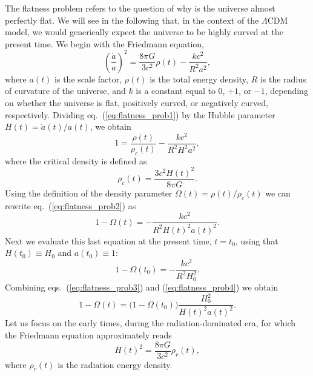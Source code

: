 \documentclass[11pt, a4paper,oneside,openright]{book}
\numberwithin{equation}{section}
\begin{document}
The flatness problem refers to the question of why is the universe almost perfectly flat. We will see in the following that, in the context of the $\Lambda$CDM model, we would generically expect the universe to be highly curved at the present time. We begin with the Friedmann equation,
\begin{equation} \label{eq:flatness_prob1}
\left(\frac{\dot{a}}{a}\right)^2=\frac{8\pi G}{3c^2}\rho(t)-\frac{kc^2}{R^2a^2},
\end{equation}
where $a(t)$ is the scale factor, $\rho(t)$ is the total energy density, $R$ is the radius of curvature of the universe, and $k$ is a constant equal to $0$, $+1$, or $-1$, depending on whether the universe is flat, positively curved, or negatively curved, respectively. Dividing eq.\ (\ref{eq:flatness_prob1}) by the Hubble parameter $H(t)=\dot{a}(t)/a(t)$, we obtain
\begin{equation} \label{eq:flatness_prob2}
1=\frac{\rho(t)}{\rho_c(t)}-\frac{kc^2}{R^2H^2a^2},
\end{equation}
where the critical density is defined as
\begin{equation}
\rho_c(t)=\frac{3c^2H(t)^2}{8\pi G}.
\end{equation}
Using the definition of the density parameter $\Omega(t)=\rho(t)/\rho_c(t)$ we can rewrite eq.\ (\ref{eq:flatness_prob2}) as
\begin{equation} \label{eq:flatness_prob3}
1-\Omega(t)=-\frac{kc^2}{R^2H(t)^2a(t)^2}.
\end{equation}
Next we evaluate this last equation at the present time, $t=t_0$, using that $H(t_0)\equiv H_0$ and $a(t_0)\equiv1$:
\begin{equation} \label{eq:flatness_prob4}
1-\Omega(t_0)=-\frac{kc^2}{R^2H_0^2}.
\end{equation}
Combining eqs.\ (\ref{eq:flatness_prob3}) and (\ref{eq:flatness_prob4}) we obtain
\begin{equation} \label{eq:flatness_prob7}
1-\Omega(t)=\big(1-\Omega(t_0)\big)\frac{H_0^2}{H(t)^2a(t)^2}.
\end{equation}
Let us focus on the early times, during the radiation-dominated era, for which the Friedmann equation approximately reads
\begin{equation} \label{eq:flatness_prob5}
H(t)^2=\frac{8\pi G}{3c^2}\rho_r(t),
\end{equation}
where $\rho_r(t)$ is the radiation energy density.

\par\vspace{\baselineskip}
\end{document}
